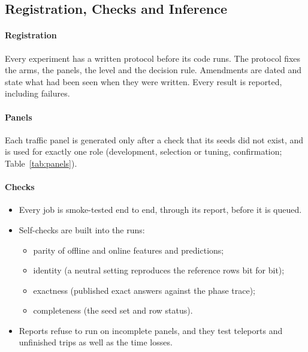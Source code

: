\subsection{Registration, Checks and Inference}\label{sec:inference}
\paragraph{Registration} Every experiment has a written protocol before its code runs. The protocol fixes the arms, the panels, the
level and the decision rule. Amendments are dated and state what had been seen when they were written. Every result is reported,
including failures.
\paragraph{Panels} Each traffic panel is generated only after a check that its seeds did not exist, and is used for exactly one role
(development, selection or tuning, confirmation; Table~\ref{tab:panels}).
\paragraph{Checks}
\begin{itemize}\setlength\itemsep{1pt}
\item Every job is smoke-tested end to end, through its report, before it is queued.
\item Self-checks are built into the runs:
\begin{itemize}\setlength\itemsep{0pt}
\item parity of offline and online features and predictions;
\item identity (a neutral setting reproduces the reference rows bit for bit);
\item exactness (published exact answers against the phase trace);
\item completeness (the seed set and row status).
\end{itemize}
\item Reports refuse to run on incomplete panels, and they test teleports and unfinished trips as well as the time losses.
\end{itemize}
